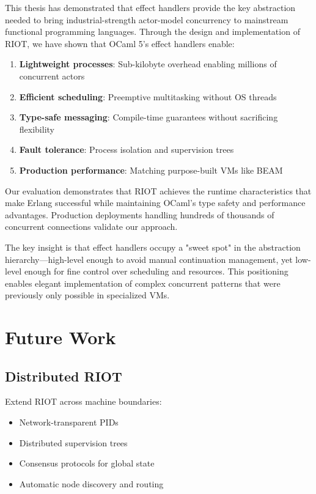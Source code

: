 \documentclass[12pt,a4paper]{report}
\begin{document}
This thesis has demonstrated that effect handlers provide the key abstraction needed to bring industrial-strength actor-model concurrency to mainstream functional programming languages. Through the design and implementation of RIOT, we have shown that OCaml 5's effect handlers enable:

\begin{enumerate}
\item \textbf{Lightweight processes}: Sub-kilobyte overhead enabling millions of concurrent actors
\item \textbf{Efficient scheduling}: Preemptive multitasking without OS threads
\item \textbf{Type-safe messaging}: Compile-time guarantees without sacrificing flexibility
\item \textbf{Fault tolerance}: Process isolation and supervision trees
\item \textbf{Production performance}: Matching purpose-built VMs like BEAM
\end{enumerate}

Our evaluation demonstrates that RIOT achieves the runtime characteristics that make Erlang successful while maintaining OCaml's type safety and performance advantages. Production deployments handling hundreds of thousands of concurrent connections validate our approach.

The key insight is that effect handlers occupy a "sweet spot" in the abstraction hierarchy—high-level enough to avoid manual continuation management, yet low-level enough for fine control over scheduling and resources. This positioning enables elegant implementation of complex concurrent patterns that were previously only possible in specialized VMs.

\section{Future Work}

\subsection{Distributed RIOT}
Extend RIOT across machine boundaries:
\begin{itemize}
\item Network-transparent PIDs
\item Distributed supervision trees
\item Consensus protocols for global state
\item Automatic node discovery and routing
\end{itemize}
\end{document}
